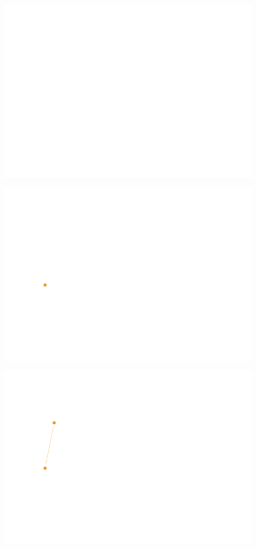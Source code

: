 \documentclass{article}\usepackage[]{graphicx}\usepackage[]{color}
\newenvironment{knitrout}{}{} %
\begin{document}
\begin{knitrout}
\color{fgcolor}
\includegraphics[width=\textwidth]{figure/dice1-1} 

\includegraphics[width=\textwidth]{figure/dice1-2} 

\includegraphics[width=\textwidth]{figure/dice1-3} 


\end{knitrout}
\end{document}
